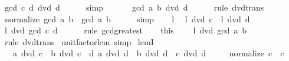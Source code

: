 \begin{isabellebody}
\ {\isachardoublequoteopen}gcd\ c\ d\ dvd\ d{\isachardoublequoteclose}\isanewline
\ \ \ \ \isamarkupfalse%
\ simp\isanewline
\ \ \isamarkupfalse%
\ {\isacharasterisk}{\kern0pt}\ \isamarkupfalse%
\ {\isachardoublequoteopen}gcd\ a\ b\ dvd\ d{\isachardoublequoteclose}\isanewline
\ \ \ \ \isamarkupfalse%
\ {\isacharparenleft}{\kern0pt}rule\ dvd{\isacharunderscore}{\kern0pt}trans{\isacharparenright}{\kern0pt}\isanewline
\ \ \isamarkupfalse%
\ {\isachardoublequoteopen}normalize\ {\isacharparenleft}{\kern0pt}gcd\ a\ b{\isacharparenright}{\kern0pt}\ {\isacharequal}{\kern0pt}\ gcd\ a\ b{\isachardoublequoteclose}\isanewline
\ \ \ \ \isamarkupfalse%
\ simp\isanewline
\ \ \isamarkupfalse%
\ l\ \isamarkupfalse%
\ {\isachardoublequoteopen}l\ dvd\ c{\isachardoublequoteclose}\ \ {\isachardoublequoteopen}l\ dvd\ d{\isachardoublequoteclose}\isanewline
\ \ \isamarkupfalse%
\ \isamarkupfalse%
\ {\isachardoublequoteopen}l\ dvd\ gcd\ c\ d{\isachardoublequoteclose}\isanewline
\ \ \ \ \isamarkupfalse%
\ {\isacharparenleft}{\kern0pt}rule\ gcd{\isacharunderscore}{\kern0pt}greatest{\isacharparenright}{\kern0pt}\isanewline
\ \ \isamarkupfalse%
\ this\ \ {\isacharasterisk}{\kern0pt}{\isacharasterisk}{\kern0pt}\ \isamarkupfalse%
\ {\isachardoublequoteopen}l\ dvd\ gcd\ a\ b{\isachardoublequoteclose}\isanewline
\ \ \ \ \isamarkupfalse%
\ {\isacharparenleft}{\kern0pt}rule\ dvd{\isacharunderscore}{\kern0pt}trans{\isacharparenright}{\kern0pt}\isanewline
{}\isamarkupfalse%
%
\endisatagproof
{\isafoldproof}%
%
\isadelimproof
\isanewline
%
\endisadelimproof
\isanewline
{}\isamarkupfalse%
\ unit{\isacharunderscore}{\kern0pt}factor{\isacharunderscore}{\kern0pt}lcm\ {\isacharbrackleft}{\kern0pt}simp{\isacharbrackright}{\kern0pt}\isanewline
\isanewline
{}\isamarkupfalse%
\ lcmI{\isacharcolon}{\kern0pt}\isanewline
\ \ \ {\isachardoublequoteopen}a\ dvd\ c{\isachardoublequoteclose}\ \ {\isachardoublequoteopen}b\ dvd\ c{\isachardoublequoteclose}\ \ {\isachardoublequoteopen}{\isasymAnd}d{\isachardot}{\kern0pt}\ a\ dvd\ d\ {\isasymLongrightarrow}\ b\ dvd\ d\ {\isasymLongrightarrow}\ c\ dvd\ d{\isachardoublequoteclose}\isanewline
\ \ \ \ \ {\isachardoublequoteopen}normalize\ c\ {\isacharequal}{\kern0pt}\ c{\isachardoublequoteclose}\isanewline

\end{isabellebody}
